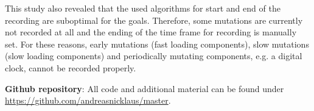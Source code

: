 \documentclass[a4paper, 12pt]{article}
\makeatletter
\renewcommand\listoffigures{%
  \section{\listfigurename}%
  \@mkboth{\MakeUppercase\listfigurename}{\MakeUppercase\listfigurename}%
  \@starttoc{lof}%
}
\renewcommand\listoftables{%
  \section{\listtablename}%
  \@mkboth{\MakeUppercase\listtablename}{\MakeUppercase\listtablename}%
  \@starttoc{lot}%
}
\renewcommand\lstlistoflistings{
  \section{\lstlistlistingname}
  \@starttoc{lol}%
}
\makeatother
\begin{document}
This study also revealed that the used algorithms for start and end of the recording are suboptimal for the goals. 
Therefore, some mutations are currently not recorded at all and the ending of the time frame for recording is manually set.
For these reasons, early mutations (fast loading components), slow mutations (slow loading components) and periodically mutating components, e.g. a digital clock, cannot be recorded properly.

\pagebreak

\appendix



\printnoidxglossary[
  type=\acronymtype,
  nonumberlist,
  nogroupskip,
]

{}

\textbf{Github repository}: All code and additional material can be found under \url{https://github.com/andreasnicklaus/master}.

\end{document}
